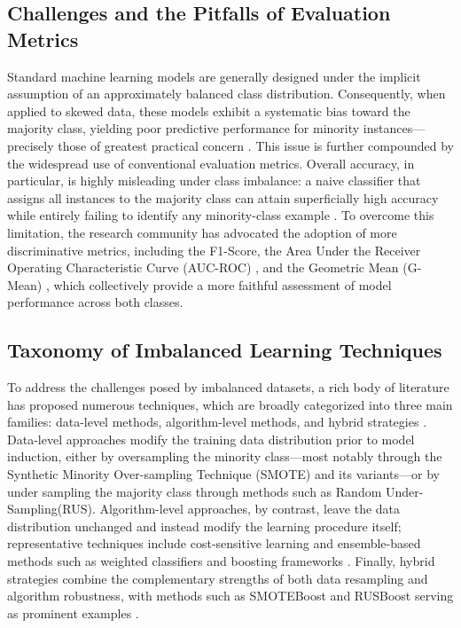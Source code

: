 \documentclass[sigconf]{acmart}
\begin{document}
\subsection{Challenges and the Pitfalls of Evaluation Metrics}
Standard machine learning models are generally designed under the implicit assumption of an approximately balanced class distribution. Consequently, when applied to skewed data, these models exhibit a systematic bias toward the majority class, yielding poor predictive performance for minority instances---precisely those of greatest practical concern \cite{1}.
This issue is further compounded by the widespread use of conventional evaluation metrics. Overall accuracy, in particular, is highly misleading under class imbalance: a naive classifier that assigns all instances to the majority class can attain superficially high accuracy while entirely failing to identify any minority-class example \cite{5}.
To overcome this limitation, the research community has advocated the adoption of more discriminative metrics, including the F1-Score, the Area Under the Receiver Operating Characteristic Curve (AUC-ROC) \cite{6}, and the Geometric Mean (G-Mean) \cite{7}, which collectively provide a more faithful assessment of model performance across both classes.


\subsection{Taxonomy of Imbalanced Learning Techniques}
To address the challenges posed by imbalanced datasets, a rich body of literature has proposed numerous techniques, which are broadly categorized into three main families: data-level methods, algorithm-level methods, and hybrid strategies \cite{1, 8}.
Data-level approaches modify the training data distribution prior to model induction, either by oversampling the minority class---most notably through the Synthetic Minority Over-sampling Technique (SMOTE) \cite{2} and its variants---or by under sampling the majority class through methods such as Random Under-Sampling(RUS).
Algorithm-level approaches, by contrast, leave the data distribution unchanged and instead modify the learning procedure itself; representative techniques include cost-sensitive learning and ensemble-based methods such as weighted classifiers and boosting frameworks \cite{9}.
Finally, hybrid strategies combine the complementary strengths of both data resampling and algorithm robustness, with methods such as SMOTEBoost and RUSBoost serving as prominent examples \cite{9}.
 
\end{document}
